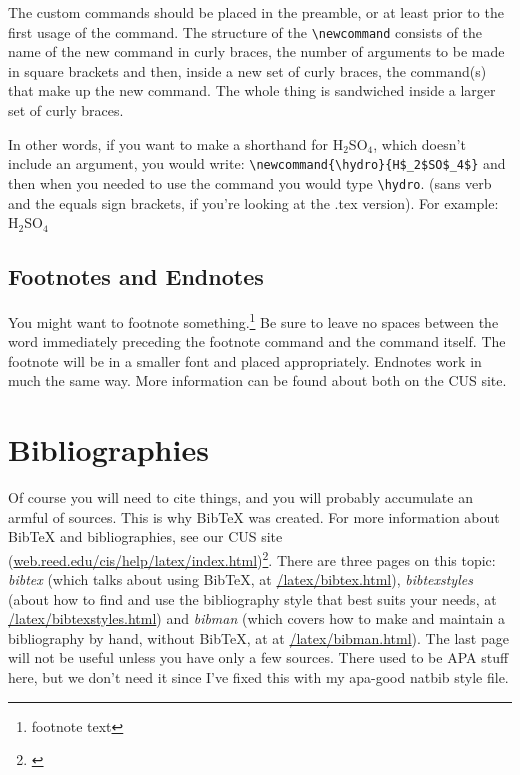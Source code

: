 \documentclass[12pt,twoside]{reedthesis}
\begin{document}
The custom commands should be placed in the preamble, or at least prior to the first usage of the command. The structure of the \verb=\newcommand= consists of the name of the new command in curly braces, the number of arguments to be made in square brackets and then, inside a new set of curly braces, the command(s) that make up the new command. The whole thing is sandwiched inside a larger set of curly braces. 

\newcommand{\hydro}{H$_2$SO$_4$}

In other words, if you want to make a shorthand for H$_2$SO$_4$, which doesn't include an argument, you would write: \verb=\newcommand{\hydro}{H$_2$SO$_4$}= and then when you needed  to use the command you would type \verb=\hydro=. (sans verb and the equals sign brackets, if you're looking at the .tex version). For example: \hydro

\subsection{Footnotes and Endnotes}
	You might want to footnote something.\footnote{footnote text} Be sure to leave no spaces between the word immediately preceding the footnote command and the command itself. The footnote will be in a smaller font and placed appropriately. Endnotes work in much the same way. More information can be found about both on the CUS site.
	
\section{Bibliographies}
	Of course you will need to cite things, and you will probably accumulate an armful of sources. This is why BibTeX was created. For more information about BibTeX and bibliographies, see our CUS site (\url{web.reed.edu/cis/help/latex/index.html})\footnote{\cite{reedweb:2007}}. There are three pages on this topic: {\it bibtex} (which talks about using BibTeX, at \url{/latex/bibtex.html}), {\it bibtexstyles} (about how to find and use the bibliography style that best suits your needs, at \url{/latex/bibtexstyles.html}) and {\it bibman} (which covers how to make and maintain a bibliography by hand, without BibTeX, at at \url{/latex/bibman.html}). The last page will not be useful unless you have only a few sources. There used to be APA stuff here, but we don't need it since I've fixed this with my apa-good natbib style file.
	
\end{document}
